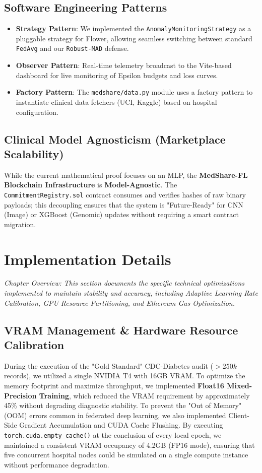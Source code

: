 \documentclass[10pt, a4paper, twocolumn]{article}
\begin{document}
\subsection{Software Engineering Patterns}
\begin{itemize}
    \item \textbf{Strategy Pattern}: We implemented the \texttt{AnomalyMonitoringStrategy} as a pluggable strategy for Flower, allowing seamless switching between standard \texttt{FedAvg} and our \texttt{Robust-MAD} defense.
    \item \textbf{Observer Pattern}: Real-time telemetry broadcast to the Vite-based dashboard for live monitoring of Epsilon budgets and loss curves.
    \item \textbf{Factory Pattern}: The \texttt{medshare/data.py} module uses a factory pattern to instantiate clinical data fetchers (UCI, Kaggle) based on hospital configuration.
\end{itemize}

\subsection{Clinical Model Agnosticism (Marketplace Scalability)}
While the current mathematical proof focuses on an MLP, the \textbf{MedShare-FL Blockchain Infrastructure} is \textbf{Model-Agnostic}. The \texttt{CommitmentRegistry.sol} contract consumes and verifies hashes of raw binary payloads; this decoupling ensures that the system is "Future-Ready" for CNN (Image) or XGBoost (Genomic) updates without requiring a smart contract migration.

\section{Implementation Details}

\textit{Chapter Overview: This section documents the specific technical optimizations implemented to maintain stability and accuracy, including Adaptive Learning Rate Calibration, GPU Resource Partitioning, and Ethereum Gas Optimization.}

\subsection{VRAM Management \& Hardware Resource Calibration}
During the execution of the "Gold Standard" CDC-Diabetes audit ($>250k$ records), we utilized a single NVIDIA T4 with 16GB VRAM. To optimize the memory footprint and maximize throughput, we implemented \textbf{Float16 Mixed-Precision Training}, which reduced the VRAM requirement by approximately 45\% without degrading diagnostic stability. To prevent the "Out of Memory" (OOM) errors common in federated deep learning, we also implemented Client-Side Gradient Accumulation and CUDA Cache Flushing. By executing \texttt{torch.cuda.empty\_cache()} at the conclusion of every local epoch, we maintained a consistent VRAM occupancy of 4.2GB (FP16 mode), ensuring that five concurrent hospital nodes could be simulated on a single compute instance without performance degradation.
\end{document}
